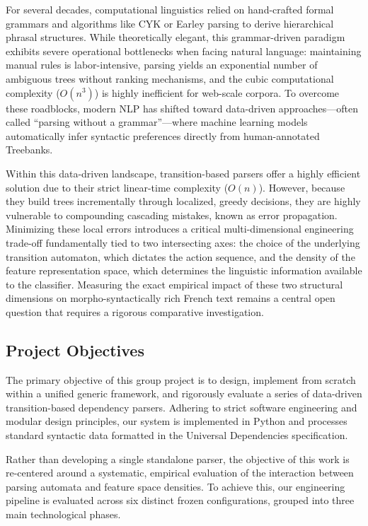 \documentclass[12pt,a4paper]{article}
\begin{document}
For several decades, computational linguistics relied on hand-crafted formal grammars and algorithms like CYK or Earley parsing to derive hierarchical phrasal structures. While theoretically elegant, this grammar-driven paradigm exhibits severe operational bottlenecks when facing natural language: maintaining manual rules is labor-intensive, parsing yields an exponential number of ambiguous trees without ranking mechanisms, and the cubic computational complexity ($O(n^3)$) is highly inefficient for web-scale corpora. To overcome these roadblocks, modern NLP has shifted toward data-driven approaches—often called ``parsing without a grammar''—where machine learning models automatically infer syntactic preferences directly from human-annotated Treebanks.

Within this data-driven landscape, transition-based parsers offer a highly efficient solution due to their strict linear-time complexity ($O(n)$). However, because they build trees incrementally through localized, greedy decisions, they are highly vulnerable to compounding cascading mistakes, known as error propagation. Minimizing these local errors introduces a critical multi-dimensional engineering trade-off fundamentally tied to two intersecting axes: the choice of the underlying transition automaton, which dictates the action sequence, and the density of the feature representation space, which determines the linguistic information available to the classifier. Measuring the exact empirical impact of these two structural dimensions on morpho-syntactically rich French text remains a central open question that requires a rigorous comparative investigation.

\subsection{Project Objectives}
The primary objective of this group project is to design, implement from scratch within a unified generic framework, and rigorously evaluate a series of data-driven transition-based dependency parsers. Adhering to strict software engineering and modular design principles, our system is implemented in Python and processes standard syntactic data formatted in the Universal Dependencies specification.

Rather than developing a single standalone parser, the objective of this work is re-centered around a systematic, empirical evaluation of the interaction between parsing automata and feature space densities. To achieve this, our engineering pipeline is evaluated across six distinct frozen configurations, grouped into three main technological phases.
\end{document}
